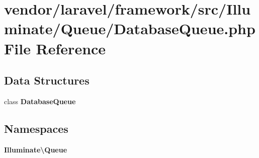 \section{vendor/laravel/framework/src/\+Illuminate/\+Queue/\+Database\+Queue.php File Reference}
\label{_database_queue_8php}
\subsection*{Data Structures}
\begin{DoxyCompactItemize}
\item 
class {\bf Database\+Queue}
\end{DoxyCompactItemize}
\subsection*{Namespaces}
\begin{DoxyCompactItemize}
\item 
 {\bf Illuminate\textbackslash{}\+Queue}
\end{DoxyCompactItemize}
